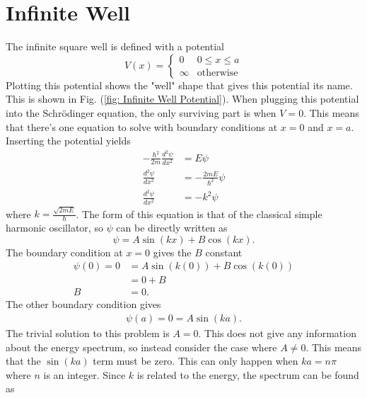 \section{Infinite Well}
The infinite square well is defined with a potential 
\begin{equation}
    V(x)=\begin{cases} 0 & 0\leq x \leq a\\
                       \infty & \text{otherwise}
        \end{cases}
\end{equation}
Plotting this potential shows the "well" shape that gives this potential its name. This is shown in Fig. (\ref{fig: Infinite Well Potential}).
When plugging this potential into the Schr\"odinger equation, the only surviving part is when $V=0$. This means that there's one equation to solve with boundary conditions at $x=0$ and $x=a$. Inserting the potential yields
\begin{align}
    -\frac{\hbar^2}{2m}\frac{d^2\psi}{dx^2}&=E\psi\nonumber\\
    \frac{d^2\psi}{dx^2}&=-\frac{2mE}{\hbar^2}\psi\nonumber\\
    \frac{d^2\psi}{dx^2}&=-k^2\psi
\end{align}
where $k=\frac{\sqrt{2mE}}{\hbar}$. The form of this equation is that of the classical simple harmonic oscillator, so $\psi$ can be directly written as 
\begin{equation}
    \psi=A\sin(kx)+B\cos(kx).
\end{equation}
The boundary condition at $x=0$ gives the $B$ constant 
\begin{align}
    \psi(0)=0&=A\sin(k(0))+B\cos(k(0))\\
    &=0+B\\
    B&=0.
\end{align}
The other boundary condition gives
\begin{align}
    \psi(a)=0=A\sin(ka).
\end{align}
The trivial solution to this problem is $A=0$. This does not give any information about the energy spectrum, so instead consider the case where $A\neq 0$. This means that the $\sin(ka)$ term must be zero. This can only happen when $ka=n\pi$ where $n$ is an integer. Since $k$ is related to the energy, the spectrum can be found as
